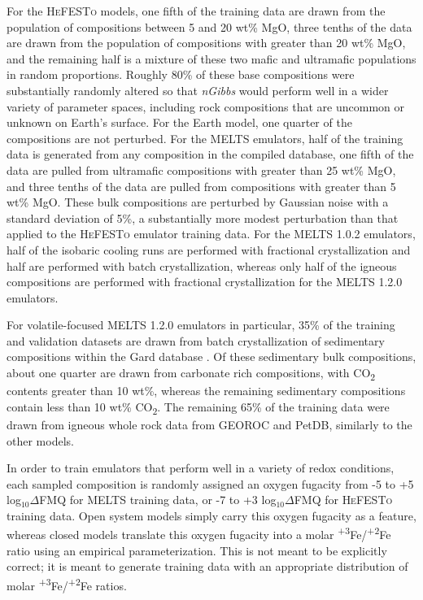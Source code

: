 For the \textsc{HeFESTo} models, one fifth of the training data are drawn from the population of compositions between 5 and 20 wt\% MgO, three tenths of the data are drawn from the population 
of compositions with greater than 20 wt\% MgO, and the remaining half is a mixture of these two mafic and ultramafic populations in random proportions. 
Roughly 80\% of these base compositions were substantially randomly altered so that \emph{nGibbs} would perform well in a wider variety of parameter spaces, 
including rock compositions that are uncommon or unknown on Earth's surface. For the Earth model, one quarter of the compositions are not perturbed. 
For the \textsc{MELTS} emulators, half of the training data is generated from any composition in the compiled database, one fifth of the data are pulled from 
ultramafic compositions with greater than 25 wt\% MgO, and three tenths of the data are pulled from compositions with greater than 5  wt\% MgO. 
These bulk compositions are perturbed by Gaussian noise with a standard deviation of 5\%, a substantially more modest perturbation than that applied to 
the \textsc{HeFESTo} emulator training data. For the \textsc{MELTS} 1.0.2 emulators, half of the isobaric cooling runs are performed with fractional crystallization 
and half are performed with batch crystallization, whereas only half of the igneous compositions are performed with fractional crystallization for the \textsc{MELTS} 
1.2.0 emulators.

For volatile-focused \textsc{MELTS} 1.2.0 emulators in particular, 35\% of the training and validation datasets are drawn from batch crystallization of sedimentary compositions 
within the Gard database \citep{gard2019}. Of these sedimentary bulk compositions, about one quarter are drawn from carbonate rich compositions, 
with CO\textsubscript{2} contents greater than 10 wt\%, whereas the remaining sedimentary compositions contain less than 10 wt\% CO\textsubscript{2}. 
The remaining 65\% of the training data were drawn from igneous whole rock data from GEOROC and PetDB, similarly to the other models. 

In order to train emulators that perform well in a variety of redox conditions, 
each sampled composition is randomly assigned an oxygen fugacity from -5 to +5 log$_{10}\Delta$FMQ for \textsc{MELTS} training data, or -7 to +3 log$_{10}\Delta$FMQ for \textsc{HeFESTo} training data. Open 
system models simply carry this oxygen fugacity as a feature, whereas closed models translate this oxygen fugacity into a molar \textsuperscript{+3}Fe/\textsuperscript{+2}Fe ratio using an empirical parameterization. This is not meant to be explicitly correct; it is meant to generate training data with an appropriate distribution of molar \textsuperscript{+3}Fe/\textsuperscript{+2}Fe ratios.

